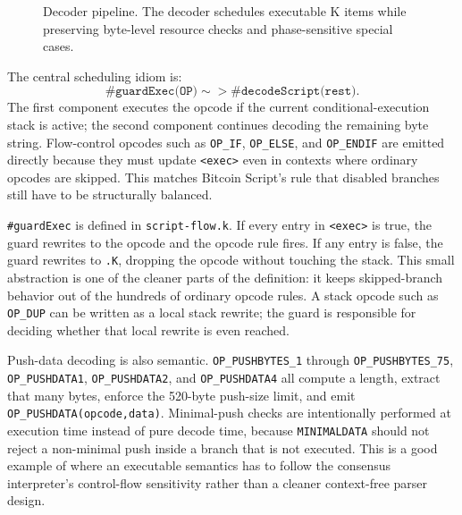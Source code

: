 \documentclass[conference]{IEEEtran}
\newcommand{\kcell}[1]{\texttt{<#1>}\xspace}
\begin{document}
\begin{figure}[t]
{%
  }
  \caption{Decoder pipeline.  The decoder schedules executable K items while
  preserving byte-level resource checks and phase-sensitive special cases.}
  \label{fig:decoder}
\end{figure}

The central scheduling idiom is:
\[
  \texttt{\#guardExec(OP)} \sim> \texttt{\#decodeScript(rest)}.
\]
The first component executes the opcode if the current conditional-execution
stack is active; the second component continues decoding the remaining byte
string.  Flow-control opcodes such as \texttt{OP\_IF}, \texttt{OP\_ELSE}, and
\texttt{OP\_ENDIF} are emitted directly because they must update
\kcell{exec} even in contexts where ordinary opcodes are skipped.  This matches
Bitcoin Script's rule that disabled branches still have to be structurally
balanced.

\texttt{\#guardExec} is defined in \texttt{script-flow.k}.  If every entry in
\kcell{exec} is true, the guard rewrites to the opcode and the opcode rule
fires.  If any entry is false, the guard rewrites to \texttt{.K}, dropping the
opcode without touching the stack.  This small abstraction is one of the
cleaner parts of the definition: it keeps skipped-branch behavior out of the
hundreds of ordinary opcode rules.  A stack opcode such as \texttt{OP\_DUP}
can be written as a local stack rewrite; the guard is responsible for deciding
whether that local rewrite is even reached.

Push-data decoding is also semantic.  \texttt{OP\_PUSHBYTES\_1} through
\texttt{OP\_PUSHBYTES\_75}, \texttt{OP\_PUSHDATA1},
\texttt{OP\_PUSHDATA2}, and \texttt{OP\_PUSHDATA4} all compute a length,
extract that many bytes, enforce the 520-byte push-size limit, and emit
\texttt{OP\_PUSHDATA(opcode,data)}.  Minimal-push checks are intentionally
performed at execution time instead of pure decode time, because
\texttt{MINIMALDATA} should not reject a non-minimal push inside a branch that
is not executed.  This is a good example of where an executable semantics has
to follow the consensus interpreter's control-flow sensitivity rather than a
cleaner context-free parser design.
\end{document}
